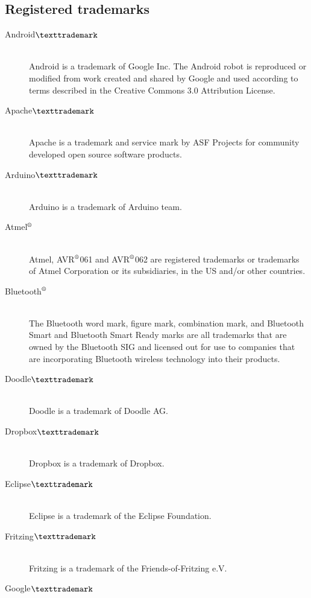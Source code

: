 \subsection{Registered trademarks}

\begin{description}
	\item[Android$\texttrademark$]\hfill \\
		Android is a trademark of Google Inc. \newline
		The Android robot is reproduced or modified from work created and shared by Google and used according to terms described in the Creative Commons 3.0 Attribution License.
	\item[Apache$\texttrademark$]\hfill \\
		Apache is a trademark and service mark by ASF Projects for community developed open source software products.
	\item[Arduino$\texttrademark$]\hfill \\
		Arduino is a trademark of Arduino team.
	\item[Atmel$\textsuperscript{\textregistered}$]\hfill \\
		Atmel, AVR$\textsuperscript{\textregistered}$061 and AVR$\textsuperscript{\textregistered}$062 are registered trademarks or trademarks of Atmel Corporation or its subsidiaries, in the US and/or other countries.
	\item[Bluetooth$\textsuperscript{\textregistered}$]\hfill \\
		The Bluetooth word mark, figure mark, combination mark, and Bluetooth Smart and Bluetooth Smart Ready marks are all trademarks that are owned by the Bluetooth SIG and licensed out for use to companies that are incorporating Bluetooth wireless technology into their products. 
	\item[Doodle$\texttrademark$]\hfill \\
		Doodle is a trademark of  Doodle AG.
	\item[Dropbox$\texttrademark$]\hfill \\
		Dropbox is a trademark of Dropbox.
	\item[Eclipse$\texttrademark$]\hfill \\
		 Eclipse is a trademark of the Eclipse Foundation.
	\item[Fritzing$\texttrademark$]\hfill \\
		Fritzing is a trademark of the Friends-of-Fritzing e.V.
	\item[Google$\texttrademark$]\hfill \\

\end{description}
